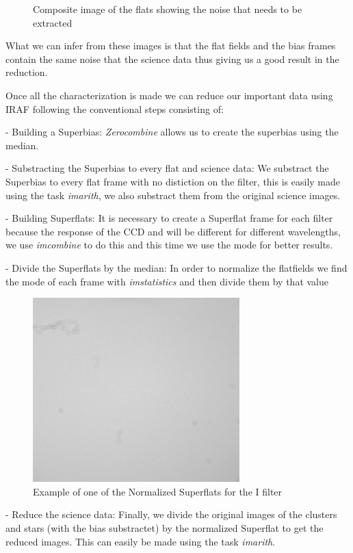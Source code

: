 \begin{figure}[H]
\begin{minipage}[b]{0.47\textwidth}
    \caption[Clean image of NGC5139]{Composite image of the flats showing the noise that needs to be extracted}
  \end{minipage}
\end{figure}

What we can infer from these images is that the flat fields and the bias frames contain the same noise that the science data thus giving us a good result in the reduction.

Once all the characterization is made we can reduce our important data using IRAF following the conventional steps consisting of: 

- Building a Superbias: \textit{Zerocombine} allows us to create the superbias using the median.

- Substracting the Superbias to every flat and science data: We substract the Superbias to every flat frame with no distiction on the filter, this is easily made using the task \textit{imarith}, we also substract them from the original science images.

- Building Superflats: It is necessary to create a Superflat frame for each filter because the response of the CCD and will be different for different wavelengths, we use \textit{imcombine} to do this and this time we use the mode for better results.   

- Divide the Superflats by the median: In order to normalize the flatfields we find the mode of each frame with \textit{imstatistics} and then divide them by that value


\begin{figure}[H]
\centering
\includegraphics[width=8cm]{images/flat_I.png}
\caption[Normalized Superflat for the filter I]{Example of one of the Normalized Superflats for the I filter}
\end{figure}

- Reduce the science data: Finally, we divide the original images of the clusters and stars (with the bias substractet) by the normalized Superflat to get the reduced images. This can easily be made using the task \textit{imarith}.

